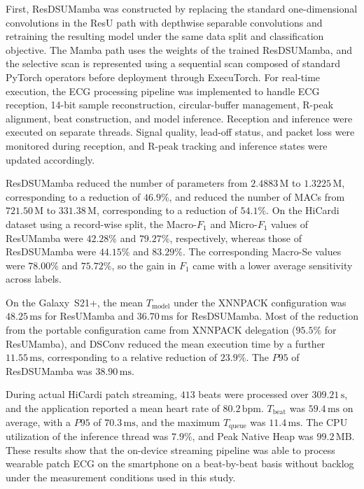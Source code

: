 First, ResDSUMamba was constructed by replacing the standard one-dimensional convolutions in the ResU path with depthwise separable convolutions and retraining the resulting model under the same data split and classification objective.
The Mamba path uses the weights of the trained ResDSUMamba, and the selective scan is represented using a sequential scan composed of standard PyTorch operators before deployment through ExecuTorch.
For real-time execution, the ECG processing pipeline was implemented to handle ECG reception, 14-bit sample reconstruction, circular-buffer management, R-peak alignment, beat construction, and model inference.
Reception and inference were executed on separate threads.
Signal quality, lead-off status, and packet loss were monitored during reception, and R-peak tracking and inference states were updated accordingly.
 
ResDSUMamba reduced the number of parameters from $2.4883\,\mathrm{M}$ to $1.3225\,\mathrm{M}$, corresponding to a reduction of $46.9\%$, and reduced the number of MACs from $721.50\,\mathrm{M}$ to $331.38\,\mathrm{M}$, corresponding to a reduction of $54.1\%$.
On the HiCardi dataset using a record-wise split, the Macro-$F_1$ and Micro-$F_1$ values of ResUMamba were $42.28\%$ and $79.27\%$, respectively, whereas those of ResDSUMamba were $44.15\%$ and $83.29\%$.
The corresponding Macro-Se values were $78.00\%$ and $75.72\%$, so the gain in $F_1$ came with a lower average sensitivity across labels.
 
On the Galaxy~S21+, the mean $T_{\mathrm{model}}$ under the XNNPACK configuration was $48.25\,\mathrm{ms}$ for ResUMamba and $36.70\,\mathrm{ms}$ for ResDSUMamba.
Most of the reduction from the portable configuration came from XNNPACK delegation ($95.5\%$ for ResUMamba), and DSConv reduced the mean execution time by a further $11.55\,\mathrm{ms}$, corresponding to a relative reduction of $23.9\%$.
The $P95$ of ResDSUMamba was $38.90\,\mathrm{ms}$.
 
During actual HiCardi patch streaming, $413$ beats were processed over $309.21\,\mathrm{s}$, and the application reported a mean heart rate of $80.2\,\mathrm{bpm}$.
$T_{\mathrm{beat}}$ was $59.4\,\mathrm{ms}$ on average, with a $P95$ of $70.3\,\mathrm{ms}$, and the maximum $T_{\mathrm{queue}}$ was $11.4\,\mathrm{ms}$.
The CPU utilization of the inference thread was $7.9\%$, and Peak Native Heap was $99.2\,\mathrm{MB}$.
These results show that the on-device streaming pipeline was able to process wearable patch ECG on the smartphone on a beat-by-beat basis without backlog under the measurement conditions used in this study.
 
